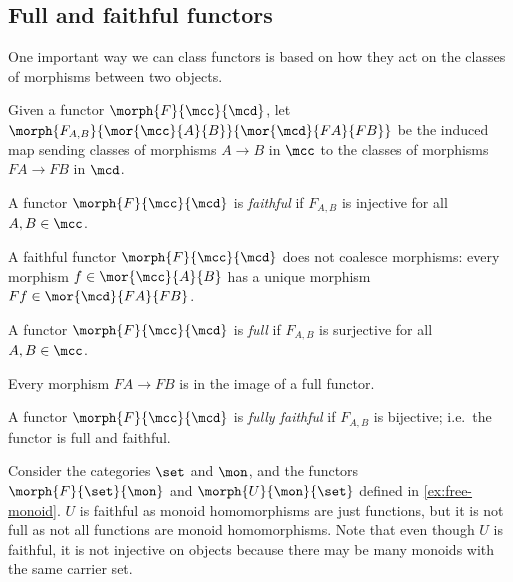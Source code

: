\subsection{Full and faithful functors}

One important way we can class functors is based on how they act on the classes
of morphisms between two objects.

\begin{notation}
    Given a functor \(\morph{F}{\mcc}{\mcd}\), let \(
    \morph{F_{A,B}}{\mor{\mcc}{A}{B}}{\mor{\mcd}{FA}{FB}}
    \) be the induced map sending classes of morphisms \(A \to B\) in \(\mcc\)
    to the classes of morphisms \(FA \to FB\) in \(\mcd\).
\end{notation}

\begin{definition}
    A functor \(\morph{F}{\mcc}{\mcd}\) is \emph{faithful} if \(F_{A,B}\) is
    injective for all \(A,B \in \mcc\).
\end{definition}

A faithful functor \(\morph{F}{\mcc}{\mcd}\) does not coalesce morphisms: every
morphism \(f \in \mor{\mcc}{A}{B}\) has a unique morphism
\(Ff \in \mor{\mcd}{FA}{FB}\).

\begin{definition}
    A functor \(\morph{F}{\mcc}{\mcd}\) is \emph{full} if \(F_{A,B}\) is
    surjective for all \(A,B \in \mcc\).
\end{definition}

Every morphism \(FA \to FB\) is in the image of a full functor.

\begin{definition}
    A functor \(\morph{F}{\mcc}{\mcd}\) is \emph{fully faithful} if \(F_{A,B}\)
    is bijective; i.e.\ the functor is full and faithful.
\end{definition}

\begin{example}
    Consider the categories \(\set\) and \(\mon\), and the functors
    \(\morph{F}{\set}{\mon}\) and \(\morph{U}{\mon}{\set}\) defined in
    \cref{ex:free-monoid}.
    \(U\) is faithful as monoid homomorphisms are just functions, but it is not
    full as not all functions are monoid homomorphisms.
    Note that even though \(U\) is faithful, it is not injective on objects
    because there may be many monoids with the same carrier set.
\end{example}

